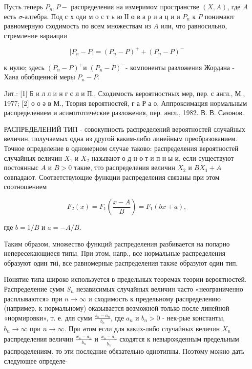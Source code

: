 \documentclass[10pt]{article}
\begin{document}
Пусть теперь $P_{n}, P-$ распределения на измеримом пространстве $(X, A)$, где $A$ есть $\sigma$-алгебра. Под с х оди м о с т ь ю ІІ о в а р и а ц и и $P_{n}$ к $P$ понимают равномерную сходимость по всем множествам из $A$ или, что равносильно, стремление вариации



\[

\left|P_{n}-P\right|=\left(P_{n}-P\right)^{+}+\left(P_{n}-P\right)^{-}

\]



к нулю; здесь $\left(P_{n}-P\right)^{+}$и $\left(P_{n}-P\right)^{-}$- компоненты разложения Жордана - Хана обобщенной меры $P_{n}-P$.



Jит.: [1] Б и л л и н г с л и П., Сходимость вероятностных мер, пер. с англ., М., 1977; [2] о о ә в М., Теория вероятностей, г а Р а о, Аппроксимация нормальным распределением и асимптотические разложения, пер. англ., 1982. В. В. Сазонов.



РАСПРЕДЕЛЕНИЙ ТИП - совокупность распределений вероятностей случайных величин, получаемых одна из другой каким-либо линейным преобразованием. Точное определение в одномерном случае таково: распределения вероятностей случайных величин $X_{1}$ и $X_{2}$ называют о д н о т и п н ы и, если существуют постоянныс $A$ и $B>0$ такие, тто распределения величин $X_{2}$ и $B X_{1}+A$ совпадают. Соответствующие функции распределения связаны при этом соотношением



\[

F_{2}(x)=F_{1}\left(\frac{x-A}{B}\right)=F_{1}(b x+a),

\]



где $b=1 / B$ и $a=-A / B$.



Таким образом, множество функций распределения разбивается на попарно непересекающиеся типы. При этом, напр., все нормальные распределения образуют один тиі, все равномерные распределения также образуют один тип.



Понятие типа широко используется в предельных теоремах теории вероятностей. Распределение сумм $S_{n}$ независимых случайных величин часто «неограниченно расплываются» при $n \rightarrow \infty$ и сходимость к предельному распределению (например, к нормальному) оказывается возможной только после линейной «нормировки», т. е. для сумм $\frac{s_{n}-a_{n}}{b_{n}}$, где $a_{n}$ и $b_{n}>0$ - нек-рые константы, $b_{n} \rightarrow \infty$ при $n \rightarrow \infty$. При әтом если для каких-либо случайных величин $X_{n}$ распределения величин $\frac{x_{n}-a_{n}}{b_{n}}$ и $\frac{x_{n}-a_{n}^{\prime}}{b_{n}^{\prime}}$ сходятся к невырожденным предельным распроделениям. то эти последние обязательно однотипны. Поэтому можно дать следующее определе-
\end{document}
